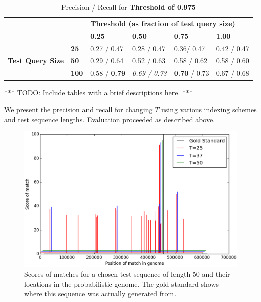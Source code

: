 \documentclass[12pt]{IEEEtran}
\begin{document}
\begin{table}[]
\centering
\caption{Precision / Recall for \textbf{Threshold of 0.975}}
\label{t975}
\begin{tabular}{ll|llll}
\cline{3-6}
                                                       &              & \multicolumn{4}{l|}{\textbf{Threshold (as fraction of test query size)}}                                                                          \\ \cline{3-6} 
\textbf{}                                              &              & \multicolumn{1}{l|}{\textbf{0.25}} & \multicolumn{1}{l|}{\textbf{0.50}} & \multicolumn{1}{l|}{\textbf{0.75}} & \multicolumn{1}{l|}{\textbf{1.00}} \\ \hline
\multicolumn{1}{|l|}{\multirow{3}{*}{\textbf{Test Query Size}}} & \textbf{25}  & 0.27 / 0.47                        & 0.28 / 0.47                         & 0.36/ 0.47                       & 0.42 / 0.47                      \\ \cline{2-2}
\multicolumn{1}{|l|}{}                                 & \textbf{50}  & 0.29 / 0.64                        & 0.52 / 0.63                         & 0.58 / 0.62                         & 0.58 / 0.60                        \\ \cline{2-2}
\multicolumn{1}{|l|}{}                                 & \textbf{100} & 0.58 / \textbf{0.79}                          & \emph{0.69 / 0.73}                    & \textbf{0.70} / 0.73                         & 0.67 / 0.68                        \\ \cline{1-2}
\end{tabular}
\end{table}




*** TODO: Include tables with a brief descriptions here. ***

We present the precision and recall for changing $T$ using various indexing schemes and test sequence lengths. Evaluation proceeded as described above.

\begin{figure}
    \centering
    \includegraphics[scale=0.4]{dists}
    \caption{Scores of matches for a chosen test sequence of length 50 and their locations in the probabilistic genome. The gold standard shows where this sequence was actually generated from.}
    \label{dists}
\end{figure}
\end{document}
